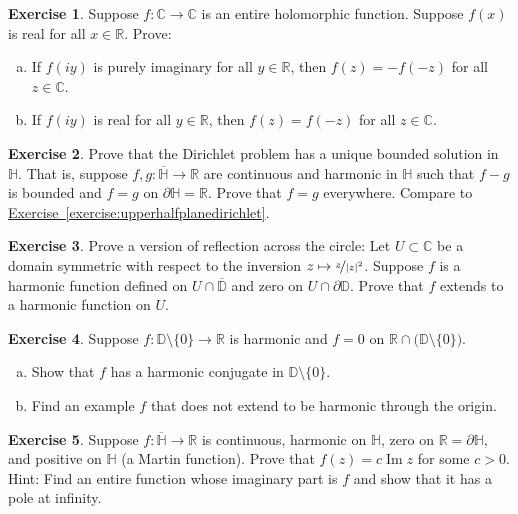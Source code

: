\documentclass[12pt,openany]{book}
\renewcommand{\Im}{\operatorname{Im}}
\newcommand{\abs}[1]{\left\lvert {#1} \right\rvert}
\newcommand{\C}{{\mathbb{C}}}
\newcommand{\R}{{\mathbb{R}}}
\newcommand{\D}{{\mathbb{D}}}
\newcommand{\bH}{{\mathbb{H}}}
\theoremstyle{plain}
\theoremstyle{remark}
\theoremstyle{definition}
\newenvironment{exbox}{%
    \def\FrameCommand{\vrule width 1pt \relax\hspace{10pt}}%
    \MakeFramed{\advance\hsize-\width\FrameRestore}%
}{%
    \endMakeFramed
}
\newenvironment{exparts}{%
    \leavevmode\begin{enumerate}[a),noitemsep,topsep=0pt,parsep=0pt,partopsep=0pt]
}{%
    \end{enumerate}
}
\theoremstyle{exercise}
\newtheorem{exercise}{Exercise}[section]
\theoremstyle{example}
\newcommand{\exerciseref}[1]{\hyperref[#1]{Exercise~\ref*{#1}}}
\begin{document}
\begin{exbox}
\begin{exercise}
Suppose $f \colon \C \to \C$ is an entire holomorphic function.
Suppose $f(x)$ is real for all $x \in \R$. Prove:
\begin{exparts}
\item
If $f(iy)$ is purely imaginary for all $y \in \R$,
then $f(z)=-f(-z)$ for all $z \in \C$.
\item
If $f(iy)$ is real for all $y \in \R$,
then $f(z)=f(-z)$ for all $z \in \C$.
\end{exparts}
\end{exercise}

\begin{exercise} \label{exercise:Hdirichuniq}
Prove that the Dirichlet problem has a unique bounded solution in $\bH$.
That is,
suppose $f,g \colon \overline{\bH} \to \R$ are 
continuous and harmonic in $\bH$ such that $f-g$ is bounded and
$f=g$ on $\partial \bH = \R$.  Prove that $f=g$ everywhere.
Compare to \exerciseref{exercise:upperhalfplanedirichlet}.
\end{exercise}

\begin{exercise}
Prove a version of reflection across the circle:  Let $U \subset
\C$ be a domain symmetric with respect to the inversion $z \mapsto
\nicefrac{z}{\abs{z}^2}$.  Suppose $f$ is a harmonic function defined on
$U \cap \overline{\D}$ and zero on $U \cap \partial \D$.
Prove that $f$ extends to a harmonic function on $U$.
\end{exercise}

\begin{exercise}
Suppose $f \colon \D \setminus \{ 0 \} \to \R$ is harmonic and $f = 0$
on $\R \cap \bigl( \D \setminus \{ 0 \} \bigr)$.
\begin{exparts}
\item
Show that $f$ has a harmonic conjugate in $\D \setminus \{ 0 \}$.
\item
Find an example $f$ that does not extend to be harmonic through the origin.
\end{exparts}
\end{exercise}

\begin{exercise}
Suppose $f \colon \overline{\bH} \to \R$ is continuous, harmonic on $\bH$, zero on $\R = \partial \bH$,
and positive on $\bH$  (a Martin function).
Prove that $f(z) = c \Im z$ for some $c > 0$.
Hint: Find an entire function whose imaginary part is $f$ and
show that it has a pole at infinity.
\end{exercise}


\end{exbox}
\end{document}
